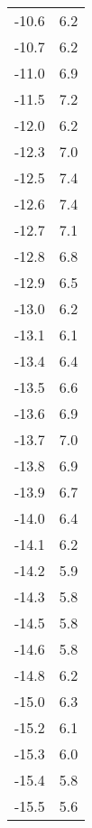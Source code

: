 \begin{table}
\begin{minipage}{0.25\textwidth}
\begin{tabular}{c|c}
        -10.6 &6.2\\
        -10.7 &6.2\\
        -11.0 &6.9\\
        -11.5 &7.2\\
        -12.0 &6.2\\
        -12.3 &7.0\\
        -12.5 &7.4\\
        -12.6 &7.4\\
        -12.7 &7.1\\
        -12.8 &6.8\\
        -12.9 &6.5\\
        -13.0 &6.2\\
        -13.1 &6.1\\
        -13.4 &6.4\\
        -13.5 &6.6\\
        -13.6 &6.9\\
        -13.7 &7.0\\
        -13.8 &6.9\\
        -13.9 &6.7\\
        -14.0 &6.4\\
        -14.1 &6.2\\
        -14.2 &5.9\\
        -14.3 &5.8\\
        -14.5 &5.8\\
        -14.6 &5.8\\
        -14.8 &6.2\\
        -15.0 &6.3\\
        -15.2 &6.1\\
        -15.3 &6.0\\
        -15.4 &5.8\\
        -15.5 &5.6\\
		\bottomrule 
	\end{tabular}
\end{minipage}
\end{table}